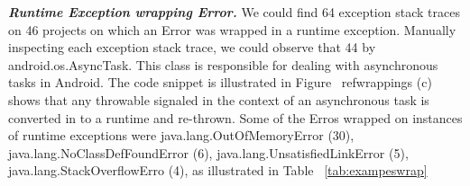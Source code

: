 \documentclass[conference]{IEEEtran}
\begin{document}




\emph{\textbf{Runtime Exception wrapping Error.}} We could find  64 exception stack traces 
on 46 projects on which an Error was wrapped in a runtime exception.
Manually inspecting each exception stack trace, we could observe that 44%
by android.os.AsyncTask. This class is responsible for dealing with asynchronous tasks in Android.
The code snippet is illustrated in Figure ~ref{wrappings} (c) shows that any throwable signaled in the context of an asynchronous 
task is converted in to a runtime and re-thrown. Some of the Erros wrapped on instances of runtime exceptions were 
java.lang.OutOfMemoryError (30), java.lang.NoClassDefFoundError (6), 
java.lang.UnsatisfiedLinkError (5), java.lang.StackOverflowErro (4), as illustrated in Table ~\ref{tab:exampeswrap}
\end{document}
